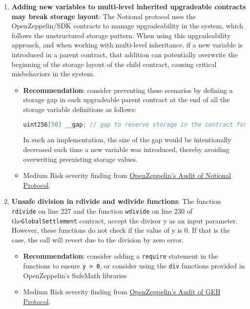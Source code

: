 \begin{enumerate}
\item\textbf{Adding new variables to multi-level inherited upgradeable contracts may break storage layout}: The Notional protocol uses the OpenZeppelin/SDK contracts to manage upgradeability in the system, which follows the unstructured storage pattern. When using this upgradeability approach, and when working with multi-level inheritance, if a new variable is introduced in a parent contract, that addition can potentially overwrite the beginning of the storage layout of the child contract, causing critical misbehaviors in the system.
	\begin{itemize}
	\item\textbf{Recommendation}: consider preventing these scenarios by defining a storage gap in each upgradeable parent contract at the end of all the storage variable definitions as follows:
\begin{lstlisting}[language={C++}]
uint256[50] __gap; // gap to reserve storage in the contract for future variable additions.	\end{lstlisting}
	In such an implementation, the size of the gap would be intentionally decreased each time a new variable was introduced, thereby avoiding overwriting preexisting storage values.
	\item Medium Risk severity finding from \href{https://blog.openzeppelin.com/notional-audit/}{OpenZeppelin’s Audit of Notional Protocol}.
	\end{itemize}

\item\textbf{Unsafe division in rdivide and wdivide functions}: The function \verb|rdivide| on line 227 and the function \verb|wdivide| on line 230 of the\linebreak\verb|GlobalSettlement| contract, accept the divisor y as an input parameter. However, these functions do not check if the value of y is 0. If that is the case, the call will revert due to the division by zero error.
	\begin{itemize}
	\item\textbf{Recommendation}: consider adding a \verb|require| statement in the functions to ensure \verb|y > 0|, or consider using the \verb|div| functions provided in OpenZeppelin’s SafeMath libraries
	\item Medium Risk severity finding from \href{https://blog.openzeppelin.com/geb-protocol-audit/}{OpenZeppelin’s Audit of GEB Protocol}.
	\end{itemize}


\end{enumerate}
